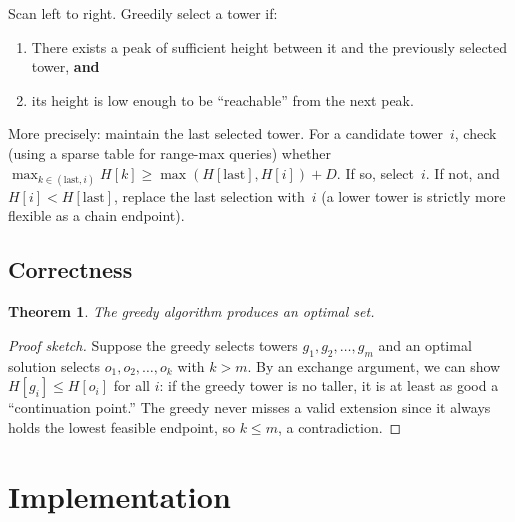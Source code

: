 \documentclass[11pt,a4paper]{article}
\newtheorem{theorem}{Theorem}
\begin{document}
Scan left to right.  Greedily select a tower if:
\begin{enumerate}
  \item There exists a peak of sufficient height between it and the
        previously selected tower, \textbf{and}
  \item its height is low enough to be ``reachable'' from the next peak.
\end{enumerate}

More precisely: maintain the last selected tower.  For a candidate tower~$i$,
check (using a sparse table for range-max queries) whether
$\max_{k \in (\mathrm{last}, i)} H[k] \ge \max(H[\mathrm{last}], H[i]) + D$.
If so, select~$i$.  If not, and $H[i] < H[\mathrm{last}]$, replace the
last selection with~$i$ (a lower tower is strictly more flexible as a
chain endpoint).

\subsection{Correctness}

\begin{theorem}
The greedy algorithm produces an optimal set.
\end{theorem}
\begin{proof}[Proof sketch]
Suppose the greedy selects towers $g_1, g_2, \ldots, g_m$ and an optimal
solution selects $o_1, o_2, \ldots, o_k$ with $k > m$.  By an exchange
argument, we can show $H[g_i] \le H[o_i]$ for all $i$: if the greedy
tower is no taller, it is at least as good a ``continuation point.''
The greedy never misses a valid extension since it always holds the
lowest feasible endpoint, so $k \le m$, a contradiction.
\end{proof}

\section{Implementation}
\end{document}
